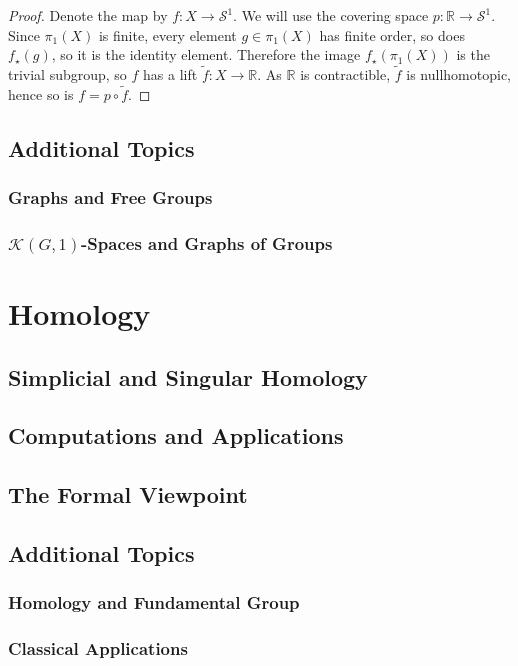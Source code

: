 \documentclass[11pt, a4paper, final]{amsart}
\newcommand{\sphere}{\mathcal{S}}
\numberwithin{theorem}{section}
\theoremstyle{definition}
\theoremstyle{remark}
\begin{document}
\begin{proof}
    Denote the map by \( f: X \to \sphere^1 \). We will use the covering space \( p: \mathbb{R} \to \sphere^1 \). Since \( \pi_1(X) \) is finite, every element \( g \in \pi_1(X) \) has finite order, so does \( f_\star(g) \), so it is the identity element. Therefore the image \( f_\star(\pi_1(X)) \) is the trivial subgroup, so \( f \) has a lift \( \widetilde{f}: X \to \mathbb{R} \). As \( \mathbb{R} \) is contractible, \( \widetilde{f} \) is nullhomotopic, hence so is \( f = p \circ \widetilde{f} \).
\end{proof}

\subsection{Additional Topics}
\subsubsection{Graphs and Free Groups}
\subsubsection{$\mathcal{K}(G, 1)$-Spaces and Graphs of Groups}

\section{Homology}
\subsection{Simplicial and Singular Homology}
\subsection{Computations and Applications}\label{subsection: Chapter 2.2 - Computations and Applications}
\subsection{The Formal Viewpoint}
\subsection{Additional Topics}
\subsubsection{Homology and Fundamental Group}
\subsubsection{Classical Applications}
\end{document}
